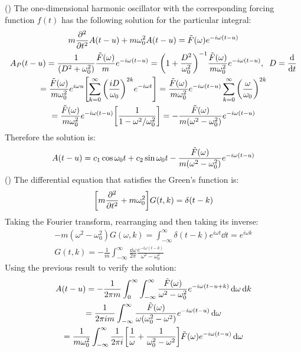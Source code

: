 \documentclass{report}
\theoremstyle{definition}
\begin{document}
\begin{chapter16}\label{prob:3}
	() The one-dimensional harmonic oscillator with the corresponding forcing function $f(t)$ has the following solution for the particular integral:
	\begin{gather*}
		m\pdv[2]{t}A(t-u) + m\omega_0^2A(t-u) = \tilde F(\omega)e^{-i\omega(t-u)} \\
		A_P(t-u) = \frac{1}{\pqty{D^2 + \omega_0^2}}\frac{\tilde F(\omega)}{m}e^{-i\omega(t-u)} = \pqty{1 + \frac{D^2}{\omega_0^2}}^{-1}\frac{\tilde F(\omega)}{m\omega_0^2}e^{-i\omega(t-u)},\;\; D = \dv{t} \\
		= \frac{\tilde F(\omega)}{m\omega_0^2}e^{i\omega u}\bqty{\sum_{k=0}^{\infty} \pqty{\frac{iD}{\omega_0}}^{2k}e^{-i\omega t}} = \frac{\tilde F(\omega)}{m\omega_0^2}e^{-i\omega(t-u)}\sum_{k=0}^{\infty}\pqty{\frac{\omega}{\omega_0}}^{2k}\\
		= \frac{\tilde F(\omega)}{m\omega_0^2}e^{-i\omega(t-u)}\bqty{\frac{1}{1-\omega^2/\omega_0^2}} = -\frac{\tilde F(\omega)}{m\pqty{\omega^2 - \omega_0^2}}e^{-i\omega(t-u)} 
	\end{gather*}
	Therefore the solution is:
	\begin{gather*}
		A(t-u) = c_1 \cos\omega_0 t + c_2 \sin\omega_0 t - \frac{\tilde F(\omega)}{m\pqty{\omega^2 - \omega_0^2}}e^{-i\omega(t-u)} 
	\end{gather*}
	()
	The differential equation that satisfies the Green's function is:
	\begin{gather*}
		\bqty{m\pdv[2]{t} + m\omega_0^2}G(t,k) = \delta(t- k)
	\end{gather*}
	Taking the Fourier transform, rearranging and then taking its inverse:
	\begin{gather*}
		-m(\omega^2 - \omega_0^2)G(\omega,k) = \int_{-\infty}^{\infty} \delta(t - k) e^{i\omega t} \dd{t} = e^{i\omega k} \\
		G(t,k) = -\frac{1}{m}\int_{-\infty}^{\infty}\frac{\dd{\omega}}{2\pi}\frac{e^{-i\omega(t-k)}}{\omega^2 - \omega_0^2} 
	\end{gather*}
	Using the previous result to verify the solution:
	\begin{gather*}
		A(t-u) = -\frac{1}{2\pi m}\int_0^{\infty}\int_{-\infty}^{\infty}\frac{\tilde F(\omega)}{\omega^2 - \omega_0^2}e^{-i\omega(t-u + k)}\dd{\omega}\dd{k} \\
		=  \frac{1}{2\pi i m}\int_{-\infty}^{\infty}\frac{\tilde F(\omega)}{\omega(\omega_0^2 - \omega^2)}e^{-i\omega(t-u)}\dd{\omega} \\ = \frac{1}{m\omega_0^2}\int_{-\infty}^{\infty}\frac{1}{2\pi i}\bqty{\frac{1}{\omega} + \frac{1}{\omega_0^2 - \omega^2}}\tilde F(\omega)e^{-i\omega(t-u)} \dd{\omega}

\end{gather*}
\end{chapter16}
\end{document}
